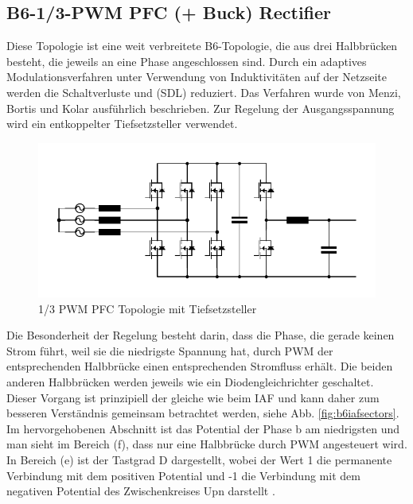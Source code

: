 	
	\subsection{B6-1/3-PWM PFC (+ Buck) Rectifier}
	\label{sec:GrundlagenB6}
	Diese Topologie ist eine weit verbreitete B6-Topologie, die aus drei Halbbrücken besteht, die jeweils an eine Phase angeschlossen sind. Durch ein adaptives Modulationsverfahren unter Verwendung von Induktivitäten auf der Netzseite werden die Schaltverluste und  (\gls{SDL}) reduziert. Das Verfahren wurde von Menzi, Bortis und Kolar \cite{13PWMPFC} ausführlich beschrieben. Zur Regelung der Ausgangsspannung wird ein entkoppelter Tiefsetzsteller verwendet.
	\begin{figure}
		\centering
		\includegraphics[width=0.9\linewidth]{content/Grafiken/B6_Buck}
		\caption[1/3 PWM PFC Topologie mit Tiefsetzsteller]{1/3 PWM PFC Topologie mit Tiefsetzsteller}
		\label{fig:b6buck}
	\end{figure}
	Die Besonderheit der Regelung besteht darin, dass die Phase, die gerade keinen Strom führt, weil sie die niedrigste Spannung hat, durch \gls{PWM} der entsprechenden Halbbrücke einen entsprechenden Stromfluss erhält. Die beiden anderen Halbbrücken werden jeweils wie ein Diodengleichrichter geschaltet. Dieser Vorgang ist prinzipiell der gleiche wie beim \gls{IAF} und kann daher zum besseren Verständnis gemeinsam betrachtet werden, siehe Abb. \ref{fig:b6iafsectors}.
	Im hervorgehobenen Abschnitt ist das Potential der Phase b am niedrigsten und man sieht im Bereich (f), dass nur eine Halbbrücke durch \gls{PWM} angesteuert wird. In Bereich (e) ist der Tastgrad \gls{D} dargestellt, wobei der Wert 1 die permanente Verbindung mit dem positiven Potential und -1 die Verbindung mit dem negativen Potential des Zwischenkreises \gls{Upn} darstellt \cite{13PWMPFC}.\\ 
